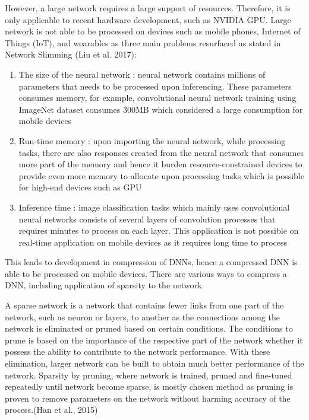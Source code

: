     However, a large network requires a large support of resources. Therefore, it is only applicable to recent hardware development, such as NVIDIA GPU. Large network is not able to be processed on devices such as mobile phones, Internet of Things (IoT), and wearables as three main problems resurfaced as stated in Network Slimming (Liu et al. 2017):
    \begin{enumerate}
    	\item The size of the neural network : neural network contains millions of parameters that needs to be processed upon inferencing. These parameters consumes memory, for example, convolutional neural network training using ImageNet dataset consumes 300MB which considered a large consumption for mobile devices
    	\item Run-time memory : upon importing the neural network, while processing tasks, there are also responses created from the neural network that consumes more part of the memory and hence it burden resource-constrained devices to provide even more memory to allocate upon processing tasks which is possible for high-end devices such as GPU
    	\item Inference time : image classification tasks which mainly uses convolutional neural networks consists of several layers of convolution processes that requires minutes to process on each layer. This application is not possible on real-time application on mobile devices as it requires long time to process
    \end{enumerate}
    
    This leads to development in compression of DNNs, hence a compressed DNN is able to be processed on mobile devices. There are various ways to compress a DNN, including application of sparsity to the network.
    
    A sparse network is a network that contains fewer links from one part of the network, such as neuron or layers, to another as the connections among the network is eliminated or pruned based on certain conditions. The conditions to prune is based on the importance of the respective part of the network whether it possess the ability to contribute to the network performance. With these elimination, larger network can be built to obtain much better performance of the network. Sparsity by pruning, where network is trained, pruned and fine-tuned repeatedly until network become sparse, is mostly chosen method as pruning is proven to remove parameters on the network without harming accuracy of the process.(Han et al., 2015)
    
